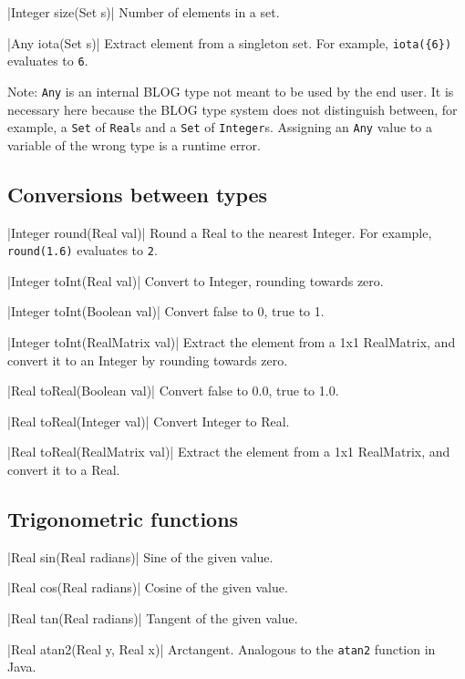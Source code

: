 \blog|Integer size(Set s)|
\myindent Number of elements in a set.

\blog|Any iota(Set s)|
\myindent Extract element from a singleton set.
For example, \verb|iota({6})| evaluates to \verb|6|.

Note: \verb|Any| is an internal BLOG type not meant to be used by the end user.
It is necessary here because the BLOG type system does not distinguish between,
for example, a \verb|Set| of \verb|Real|s and a \verb|Set| of \verb|Integer|s.
Assigning an \verb|Any| value to a variable of the wrong type is a runtime
error.


\subsection{Conversions between types}
\label{sec:builtin-conversions}

\blog|Integer round(Real val)|
\myindent Round a Real to the nearest Integer.
For example, \verb|round(1.6)| evaluates to \verb|2|.

\blog|Integer toInt(Real val)|
\myindent Convert to Integer, rounding towards zero.

\blog|Integer toInt(Boolean val)|
\myindent Convert false to 0, true to 1.

\blog|Integer toInt(RealMatrix val)|
\myindent Extract the element from a 1x1 RealMatrix, and convert it to an
Integer by rounding towards zero.

\blog|Real toReal(Boolean val)|
\myindent Convert false to 0.0, true to 1.0.

\blog|Real toReal(Integer val)|
\myindent Convert Integer to Real.

\blog|Real toReal(RealMatrix val)|
\myindent Extract the element from a 1x1 RealMatrix, and convert it to a Real.


\subsection{Trigonometric functions}
\label{sec:builtin-trig}

\blog|Real sin(Real radians)|
\myindent Sine of the given value.

\blog|Real cos(Real radians)|
\myindent Cosine of the given value.

\blog|Real tan(Real radians)|
\myindent Tangent of the given value.

\blog|Real atan2(Real y, Real x)|
\myindent Arctangent. Analogous to the \verb|atan2| function in Java.


